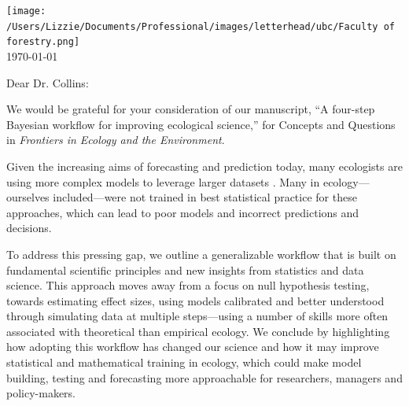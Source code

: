 \documentclass[11pt]{article}
\begin{document}

\renewcommand{\refname}{\CHead{}}

\hspace{-5ex} \texttt{[image: /Users/Lizzie/Documents/Professional/images/letterhead/ubc/Faculty of forestry.png]}
\vspace{1.5ex}\\

\setlength{\parindent}{0pt}
\setlength{\parskip}{7pt}
\today

Dear Dr. Collins:

We would be grateful for your consideration of our manuscript, ``A four-step Bayesian workflow for improving ecological science,'' for Concepts and Questions in \emph{Frontiers in Ecology and the Environment}. %

Given the increasing aims of forecasting and prediction today, many ecologists are using more complex models to leverage larger datasets \citep{anderson2021trends,muff2022rewriting}. Many in ecology---ourselves included---were not trained in best statistical practice for these approaches, which can lead to poor models and incorrect predictions and decisions. %

To address this pressing gap, we outline a generalizable workflow that is built on fundamental scientific principles and new insights from statistics and data science. This approach  moves away from a focus on null hypothesis testing, towards estimating effect sizes, using models calibrated and better understood through simulating data at multiple steps---using a number of skills more often associated with theoretical than empirical ecology. We conclude by highlighting how adopting this workflow has changed our science and how it may improve statistical and mathematical training in ecology, which could make model building, testing and forecasting more approachable for researchers, managers and policy-makers. 
\end{document}
